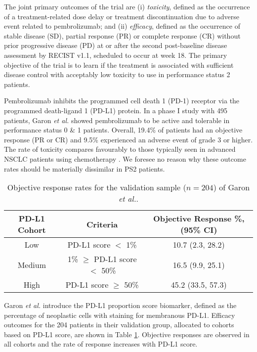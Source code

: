 \documentclass[graybox]{svmult}
\begin{document}
The joint primary outcomes of the trial are (i) \textit{toxicity}, defined as the occurrence of a treatment-related dose delay or treatment discontinuation due to adverse event related to pembrolizumab; 
and (ii) \textit{efficacy}, defined as the occurrence of stable disease (SD), partial response (PR) or complete response (CR) without prior progressive disease (PD) at or after the second post-baseline disease assessment by RECIST v1.1\cite{Eisenhauer2009}, scheduled to occur at week 18.
The primary objective of the trial is to learn if the treatment is associated with sufficient disease control with acceptably low toxicity to use in performance status 2 patients.

Pembrolizumab inhibits the programmed cell death 1 (PD-1) receptor via the programmed death-ligand 1 (PD-L1) protein.
In a phase I study with 495 patients, Garon \textit{et al.}\cite{Garon2015} showed pembrolizumab to be active and tolerable in performance status 0 \& 1 patients.
Overall, 19.4\% of patients had an objective response (PR or CR) and 9.5\% experienced an adverse event of grade 3 or higher.
The rate of toxicity compares favourably to those typically seen in advanced NSCLC patients using chemotherapy \cite{Schiller2002, Borghaei2015}.
We foresee no reason why these outcome rates should be materially dissimilar in PS2 patients. %

\begin{table}[h]
	\centering
	\caption{Objective response rates for the validation sample ($n=204$) of Garon \textit{et al.}\cite{Garon2015}.}
	\label{tab:garon.efficacy}
	\begin{tabular}{|c | c | c |}
		\hline
		PD-L1 Cohort & Criteria & Objective Response \%, (95\% CI) \\ 
		\hline
		Low & PD-L1 score $<$ 1\% & 10.7 (2.3, 28.2) \\ 
		Medium & 1\% $\geq$ PD-L1 score $<$ 50\% & 16.5 (9.9, 25.1) \\ 
		High & PD-L1 score $\geq$ 50\% & 45.2 (33.5, 57.3)\\
		\hline
	\end{tabular}
\end{table}

Garon \textit{et al.} introduce the PD-L1 proportion score biomarker, defined as the percentage of neoplastic cells with staining for membranous PD-L1. %
Efficacy outcomes for the 204 patients in their validation group, allocated to cohorts based on PD-L1 score, are shown in Table \ref{tab:garon.efficacy}.
Objective responses are observed in all cohorts and the rate of response increases with PD-L1 score.
\end{document}
